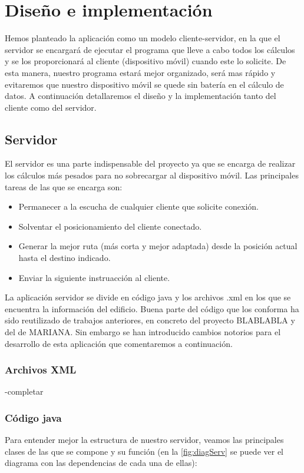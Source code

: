 \chapter{Diseño e implementación}
\label{cap:diseñoeimplementación}


Hemos planteado la aplicación como un modelo cliente-servidor, en la que el servidor se encargará de ejecutar el programa que lleve a cabo todos los cálculos y se los proporcionará al cliente (dispositivo móvil) cuando este lo solicite. De esta manera, nuestro programa estará mejor organizado, será mas rápido y evitaremos que nuestro dispositivo móvil se quede sin batería en el cálculo de datos. A continuación detallaremos el diseño y la implementación tanto del cliente como del servidor.


\section{Servidor}
El servidor es una parte indispensable del proyecto ya que se encarga de realizar los cálculos más pesados para no sobrecargar al dispositivo móvil. Las principales tareas de las que se encarga son:
\begin{itemize}
	\item Permanecer a la escucha de cualquier cliente que solicite conexión.
	\item Solventar el posicionamiento del cliente conectado.
	\item Generar la mejor ruta (más corta y mejor adaptada) desde la posición actual hasta el destino indicado.
	\item Enviar la siguiente instruacción al cliente.	
\end{itemize} 

La aplicación servidor se divide en código java y los archivos .xml en los que se encuentra la información del edificio. Buena parte del código que los conforma ha sido reutilizado de trabajos anteriores, en concreto del proyecto BLABLABLA \cite{TFGguia} y del de MARIANA. Sin embargo se han introducido cambios notorios para el desarrollo de esta aplicación que comentaremos a continuación.
\subsection{Archivos XML}
-completar
\subsection{Código java}
Para entender mejor la estructura de nuestro servidor, veamos las principales clases de las que se compone y su función (en la \ref{fig:diagServ} se puede ver el diagrama con las dependencias de cada una de ellas):

